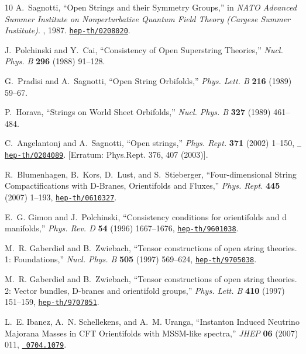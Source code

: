 \documentclass[12pt,a4paper]{article}
\begin{document}
\begin{thebibliography}{10}
	A.~Sagnotti, ``{Open Strings and their Symmetry Groups},'' in {\em {NATO
			Advanced Summer Institute on Nonperturbative Quantum Field Theory (Cargese
			Summer Institute)}}.
	, 1987.
	\newblock \href{http://www.arXiv.org/abs/hep-th/0208020}{{\tt hep-th/0208020}}.
	
	J.~Polchinski and Y.~Cai, ``{Consistency of Open Superstring Theories},'' {\em
		Nucl. Phys. B} {\bf 296} (1988) 91--128.
	
	G.~Pradisi and A.~Sagnotti, ``{Open String Orbifolds},'' {\em Phys. Lett. B}
	{\bf 216} (1989) 59--67.
	
	P.~Horava, ``{Strings on World Sheet Orbifolds},'' {\em Nucl. Phys. B} {\bf
		327} (1989) 461--484.
	
	C.~Angelantonj and A.~Sagnotti, ``{Open strings},'' {\em Phys. Rept.} {\bf 371}
	(2002) 1--150, \href{http://www.arXiv.org/abs/hep-th/0204089}{{\tt
			hep-th/0204089}}. [Erratum: Phys.Rept. 376, 407 (2003)].
	
	R.~Blumenhagen, B.~Kors, D.~Lust, and S.~Stieberger, ``{Four-dimensional String
		Compactifications with D-Branes, Orientifolds and Fluxes},'' {\em Phys.
		Rept.} {\bf 445} (2007) 1--193,
	\href{http://www.arXiv.org/abs/hep-th/0610327}{{\tt hep-th/0610327}}.
	
	E.~G. Gimon and J.~Polchinski, ``{Consistency conditions for orientifolds and d
		manifolds},'' {\em Phys. Rev. D} {\bf 54} (1996) 1667--1676,
	\href{http://www.arXiv.org/abs/hep-th/9601038}{{\tt hep-th/9601038}}.
	
	M.~R. Gaberdiel and B.~Zwiebach, ``{Tensor constructions of open string
		theories. 1: Foundations},'' {\em Nucl. Phys. B} {\bf 505} (1997) 569--624,
	\href{http://www.arXiv.org/abs/hep-th/9705038}{{\tt hep-th/9705038}}.
	
	M.~R. Gaberdiel and B.~Zwiebach, ``{Tensor constructions of open string
		theories. 2: Vector bundles, D-branes and orientifold groups},'' {\em Phys.
		Lett. B} {\bf 410} (1997) 151--159,
	\href{http://www.arXiv.org/abs/hep-th/9707051}{{\tt hep-th/9707051}}.
	
	L.~E. Ibanez, A.~N. Schellekens, and A.~M. Uranga, ``{Instanton Induced
		Neutrino Majorana Masses in CFT Orientifolds with MSSM-like spectra},'' {\em
		JHEP} {\bf 06} (2007) 011, \href{http://www.arXiv.org/abs/0704.1079}{{\tt
			0704.1079}}.
	

\end{thebibliography}
\end{document}
